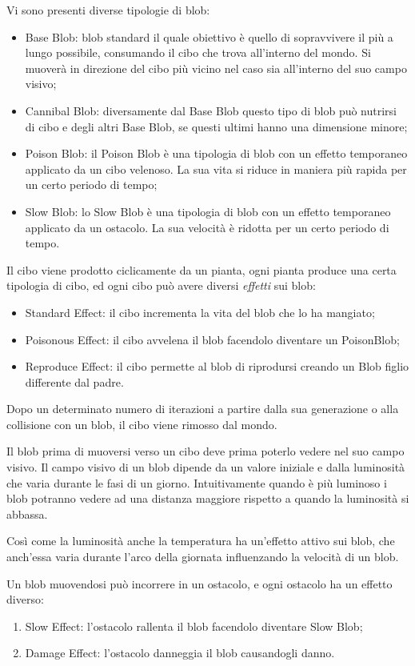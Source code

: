 Vi sono presenti diverse tipologie di blob:
\begin{itemize}
    \item Base Blob: blob standard il quale obiettivo è quello di sopravvivere il più a lungo possibile, consumando il cibo che trova all'interno del mondo. Si muoverà in direzione del cibo più vicino nel caso sia all'interno del suo campo visivo;
    \item Cannibal Blob: diversamente dal Base Blob questo tipo di blob può nutrirsi di cibo e degli altri Base Blob, se questi ultimi hanno una dimensione minore;
    \item Poison Blob: il Poison Blob è una tipologia di blob con un effetto temporaneo applicato da un cibo velenoso. La sua vita si riduce in maniera più rapida per un certo periodo di tempo;
    \item Slow Blob: lo Slow Blob è una tipologia di blob con un effetto temporaneo applicato da un ostacolo. La sua velocità è ridotta per un certo periodo di tempo.
\end{itemize}

Il cibo viene prodotto ciclicamente da un pianta, ogni pianta produce una certa tipologia di cibo, ed ogni cibo può avere diversi \textit{effetti} sui blob:
\begin{itemize}
    \item Standard Effect: il cibo incrementa la vita del blob che lo ha mangiato;
    \item Poisonous Effect: il cibo avvelena il blob facendolo diventare un PoisonBlob;
    \item Reproduce Effect: il cibo permette al blob di riprodursi creando un Blob figlio differente dal padre.
\end{itemize}
Dopo un determinato numero di iterazioni a partire dalla sua generazione o alla collisione con un blob, il cibo viene rimosso dal mondo.

Il blob prima di muoversi verso un cibo deve prima poterlo vedere nel suo campo visivo. Il campo visivo di un blob dipende da un valore iniziale e dalla luminosità che varia durante le fasi di un giorno. Intuitivamente quando è più luminoso i blob potranno vedere ad una distanza maggiore rispetto a quando la luminosità si abbassa.

Così come la luminosità anche la temperatura ha un'effetto attivo sui blob, che anch'essa varia durante l'arco della giornata influenzando la velocità di un blob.

Un blob muovendosi può incorrere in un ostacolo, e ogni ostacolo ha un effetto diverso:
\begin{enumerate}
    \item Slow Effect: l'ostacolo rallenta il blob facendolo diventare Slow Blob;
    \item Damage Effect: l'ostacolo danneggia il blob causandogli danno.
\end{enumerate}